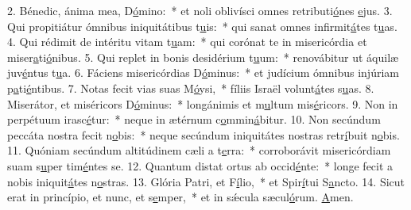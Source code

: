 2. Bénedic, ánima mea, D\uline{ó}mino:~* et noli oblivísci omnes retributi\uline{ó}nes \uline{e}jus.
3. Qui propitiátur ómnibus iniquitátibus t\uline{u}is:~* qui sanat omnes infirmit\uline{á}tes t\uline{u}as.
4. Qui rédimit de intéritu vitam t\uline{u}am:~* qui corónat te in misericórdia et miser\uline{a}ti\uline{ó}nibus.
5. Qui replet in bonis desidérium t\uline{u}um:~* renovábitur ut áquilæ juv\uline{é}ntus t\uline{u}a.
6. Fáciens misericórdias D\uline{ó}minus:~* et judícium ómnibus injúriam p\uline{a}ti\uline{é}ntibus.
7. Notas fecit vias suas M\uline{ó}ysi,~* fíliis Israël volunt\uline{á}tes s\uline{u}as.
8. Miserátor, et miséricors D\uline{ó}minus:~* longánimis et m\uline{u}ltum mis\uline{é}ricors.
9. Non in perpétuum irasc\uline{é}tur:~* neque in ætérnum c\uline{o}mmin\uline{á}bitur.
10. Non secúndum peccáta nostra fecit n\uline{o}bis:~* neque secúndum iniquitátes nostras retr\uline{í}buit n\uline{o}bis.
11. Quóniam secúndum altitúdinem cæli a t\uline{e}rra:~* corroborávit misericórdiam suam s\uline{u}per tim\uline{é}ntes se.
12. Quantum distat ortus ab occid\uline{é}nte:~* longe fecit a nobis iniquit\uline{á}tes n\uline{o}stras.
13. Glória Patri, et F\uline{í}lio,~* et Spir\uline{í}tui S\uline{a}ncto.
14. Sicut erat in princípio, et nunc, et s\uline{e}mper,~* et in sǽcula sæcul\uline{ó}rum. \uline{A}men.

